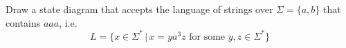 Draw a state diagram that accepts the language of strings over $\Sigma =
\{ a, b \}$ that contains $aaa$, i.e.
\[
L = \{ x \in \Sigma^* \,|\, x = ya^3 z \text{ for some } y, z \in \Sigma^*\}
\]
